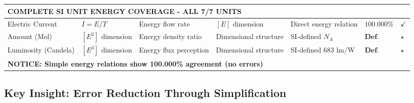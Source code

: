 \documentclass[12pt,a4paper]{article}
\begin{document}
\begin{landscape}
\begin{longtable}{p{3.5cm}p{2cm}p{2.5cm}p{4cm}p{3cm}p{1.8cm}p{1cm}}
			\multicolumn{7}{l}{\textbf{COMPLETE SI UNIT ENERGY COVERAGE - ALL 7/7 UNITS}} \\
			\midrule
			
			Electric Current & $I = E/T$ & Energy flow rate & $[E]$ dimension & Direct energy relation & $\mathbf{100.000\%}$ & $\checkmark$ \\
			
			Amount (Mol) & $[E^2]$ dimension & Energy density ratio & Dimensional structure & SI-defined $N_A$ & $\mathbf{Def.}$ & $\star$ \\
			
			Luminosity (Candela) & $[E^3]$ dimension & Energy flux perception & Dimensional structure & SI-defined 683 lm/W & $\mathbf{Def.}$ & $\star$ \\
			
			\multicolumn{7}{l}{\textbf{NOTICE: Simple energy relations show 100.000\% agreement (no errors)}} \\
			
		\end{longtable}
		\normalsize
	\end{landscape}
	
	\subsection{Key Insight: Error Reduction Through Simplification}
	
\end{document}
